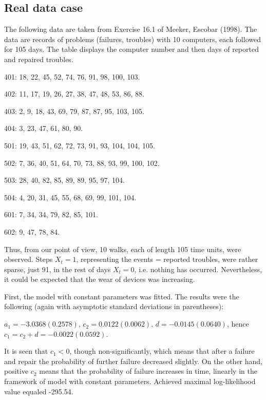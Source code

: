 \documentclass[11pt]{article}
\begin{document}
\subsection{Real data case}

The following data are taken from Exercise 16.1 of Meeker, Escobar
(1998). The data are records of problems (failures, troubles) with
10 computers, each followed for 105 days. The table displays
the computer number and then days of reported and repaired
troubles.

\medskip

   401: 18, 22, 45, 52, 74, 76, 91, 98, 100, 103.

   402: 11, 17, 19, 26, 27, 38, 47, 48, 53, 86, 88.

   403: 2, 9, 18, 43, 69, 79, 87, 87, 95, 103, 105.

   404: 3, 23, 47, 61, 80, 90.

   501: 19, 43, 51, 62, 72, 73, 91, 93, 104, 104, 105.

   502: 7, 36, 40, 51, 64, 70, 73, 88, 93, 99, 100, 102.

   503: 28, 40, 82, 85, 89, 89, 95, 97, 104.

   504: 4, 20, 31, 45, 55, 68, 69, 99, 101, 104.

   601: 7, 34, 34, 79, 82, 85, 101.

   602: 9, 47, 78, 84.

\medskip

Thus, from our point of view, 10 walks, each of length 105 time
units, were observed. Steps $X_t=1$, representing the events = reported
troubles, were rather sparse, just 91, in the rest of days
$X_t=0$, i.e. nothing has occurred. Nevertheless, it could be
expected that the wear of devices was increasing.

First, the model with constant parameters was fitted. The results
were the following (again with asymptotic standard deviations in
parentheses):

$ a_1=-3.0368 (0.2578),\,c_2=0.0122 (0.0062),\, d=-0.0145
(0.0640)$,
hence $c_1 =  c_2 + d = -0.0022 (0.0592)$.

It is seen that $c_1<0$, though non-significantly, which means
that after a failure and repair the probability of further failure
decreased slightly. On the other hand, positive $c_2$ means that
the probability of failure increases in time, linearly in the
framework of model with constant parameters. Achieved maximal log-likelihood value
equaled -295.54.
\end{document}
